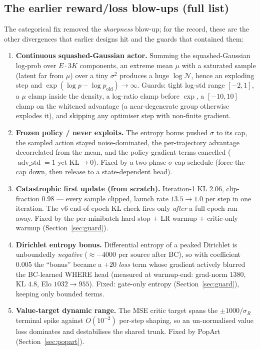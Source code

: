 \documentclass[11pt]{article}
\begin{document}
\subsection{The earlier reward/loss blow-ups (full list)}
The categorical fix removed the \emph{sharpness} blow-up; for the record, these are the other
divergences that earlier designs hit and the guards that contained them:
\begin{enumerate}[nosep,leftmargin=1.8em]
\item \textbf{Continuous squashed-Gaussian actor.} Summing the squashed-Gaussian log-prob over
  $E\!\cdot\!3K$ components, an extreme mean $\mu$ with a saturated sample (latent far from $\mu$) over a
  tiny $\sigma^2$ produces a huge $\log\mathcal N$, hence an exploding step and
  $\exp(\log p-\log p_{\mathrm{old}})\to\infty$. Guards: tight log-std range $[-2,1]$, a $\mu$ clamp
  inside the density, a log-ratio clamp before $\exp$, a $[-10,10]$ clamp on the whitened advantage (a
  near-degenerate group otherwise explodes it), and skipping any optimiser step with non-finite gradient.
\item \textbf{Frozen policy / never exploits.} The entropy bonus pushed $\sigma$ to its cap, the sampled
  action stayed noise-dominated, the per-trajectory advantage decorrelated from the mean, and the
  policy-gradient terms cancelled ($\operatorname{adv\_std}=1$ yet $\mathrm{KL}\to0$). Fixed by a
  two-phase $\sigma$-cap schedule (force the cap down, then release to a state-dependent head).
\item \textbf{Catastrophic first update (from scratch).} Iteration-1 KL $2.06$, clip-fraction $0.98$ ---
  every sample clipped, launch rate $13.5\!\to\!1.0$ per step in one iteration. The v6 end-of-epoch KL
  check fires only \emph{after} a full epoch ran away. Fixed by the per-minibatch hard stop $+$ LR warmup
  $+$ critic-only warmup (Section~\ref{sec:guard}).
\item \textbf{Dirichlet entropy bonus.} Differential entropy of a peaked Dirichlet is unboundedly
  \emph{negative} ($\approx-4000$ per source after BC), so with coefficient $0.005$ the ``bonus'' became
  a $+20$ \emph{loss} term whose gradient actively blurred the BC-learned WHERE head (measured at
  warmup-end: grad-norm $1380$, KL $4.8$, Elo $1032\!\to\!955$). Fixed: gate-only entropy
  (Section~\ref{sec:guard}), keeping only bounded terms.
\item \textbf{Value-target dynamic range.} The MSE critic target spans the $\pm1000/\sigma_R$ terminal
  spike against $O(10^{-2})$ per-step shaping, so an un-normalised value loss dominates and destabilises
  the shared trunk. Fixed by PopArt (Section~\ref{sec:popart}).
\end{enumerate}
\end{document}
